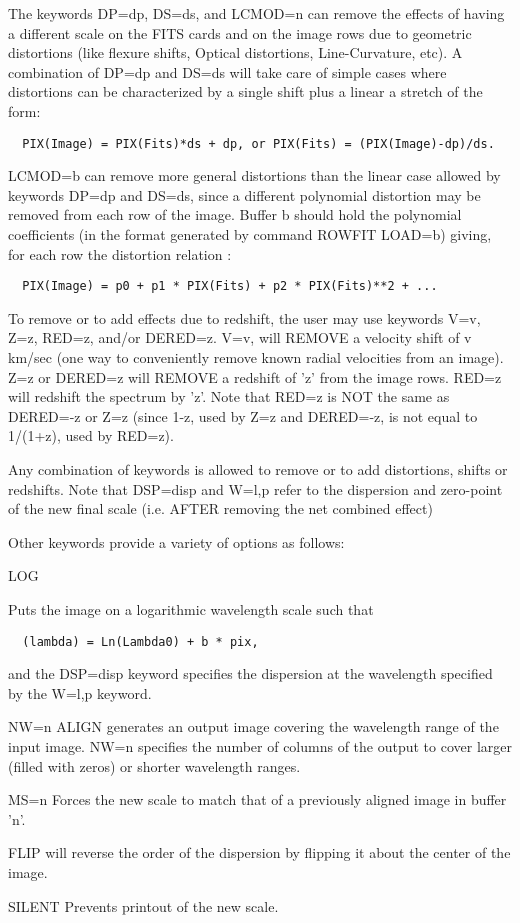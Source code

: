 The keywords DP=dp, DS=ds, and LCMOD=n can remove the effects of having a
different scale on the FITS cards and on the image rows due to geometric
distortions (like flexure shifts, Optical distortions, Line-Curvature,
etc). A combination of DP=dp and DS=ds will take care of simple cases where
distortions can be characterized by a single shift plus a linear a stretch
of the form:
\begin{verbatim} 
  PIX(Image) = PIX(Fits)*ds + dp, or PIX(Fits) = (PIX(Image)-dp)/ds.
\end{verbatim} 

LCMOD=b can remove more general distortions than the linear case allowed by
keywords DP=dp and DS=ds, since a different polynomial distortion may be
removed from each row of the image. Buffer b should hold the polynomial
coefficients (in the format generated by command ROWFIT LOAD=b) giving, for
each row the distortion relation :
\begin{verbatim} 
  PIX(Image) = p0 + p1 * PIX(Fits) + p2 * PIX(Fits)**2 + ...
\end{verbatim} 
To remove or to add effects due to redshift, the user may use keywords V=v,
Z=z, RED=z, and/or DERED=z. V=v, will REMOVE a velocity shift of v km/sec
(one way to conveniently remove known radial velocities from an image). Z=z
or DERED=z will REMOVE a redshift of 'z' from the image rows. RED=z will
redshift the spectrum by 'z'. Note that RED=z is NOT the same as DERED=-z
or Z=z (since 1-z, used by Z=z and DERED=-z, is not equal to 1/(1+z), used
by RED=z).
 
Any combination of keywords is allowed to remove or to add distortions,
shifts or redshifts. Note that DSP=disp and W=l,p refer to the dispersion
and zero-point of the new final scale (i.e. AFTER removing the net combined
effect)

Other keywords provide a variety of options as follows:
\begin{example} 
  \item[LOG\hfill]{Puts the image on a logarithmic wavelength scale such
       that
       \begin{verbatim}
  (lambda) = Ln(Lambda0) + b * pix,
       \end{verbatim}
       and the DSP=disp keyword specifies the dispersion at the wavelength
       specified by the W=l,p keyword.}

  \item[NW=n \hfill]{ALIGN generates an output image covering the
       wavelength range of the input image. NW=n specifies the number of
       columns of the output to cover larger (filled with zeros) or shorter
       wavelength ranges.}

  \item[MS=n\hfill]{Forces the new scale to match that of a previously
       aligned image in buffer 'n'.}

  \item[FLIP\hfill]{will reverse the order of the dispersion by flipping it
       about the center of the image.}

  \item[SILENT\hfill]{Prevents printout of the new scale.}
\end{example} 

